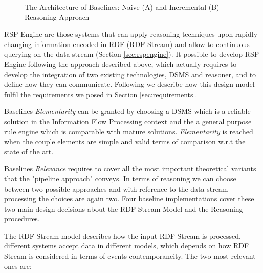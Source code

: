 \begin{figure}[tbh]
 \centering
{}
	\caption{The Architecture of \name Baselines: Naive (A) and Incremental (B) Reasoning Approach}
	\label{fig:baselines}
\end{figure}

\noindent RSP Engine are those systems that can apply reasoning techniques upon rapidly changing information encoded in RDF (RDF Stream) and allow to continuous querying on the data stream (Section \ref{sec:rspengine}). It possible to develop RSP Engine following the approach described above, which actually requires to develop the integration of two existing technologies, DSMS and reasoner, and to define how they can communicate. Following we describe how this design model fulfil the requirements we posed in Section \ref{sec:requirements}.

Baselines \textit{Elementarity} can be granted by choosing a DSMS which is a reliable solution in the Information Flow Processing context and the a general purpose rule engine which is comparable with mature solutions. \textit{Elementarity} is reached when the couple elements are simple and valid terms of comparison w.r.t the state of the art.

Baselines \textit{Relevance} requires to cover all the most important theoretical variants that the "pipeline approach" conveys. In terms of reasoning we can choose between two possible approaches and with reference to the data stream processing the choices are again two. Four baseline implementations cover these two main design decisions about the RDF Stream Model and the Reasoning procedures. 

The RDF Stream model describes how the input RDF Stream is processed, different systems accept data in different models, which depends on how RDF Stream is considered in terms of events contemporaneity. The two most relevant ones are:

